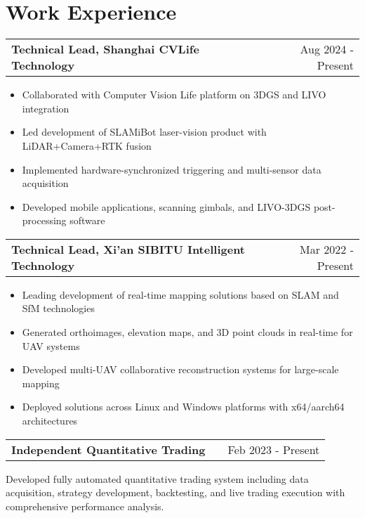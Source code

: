 \documentclass[a4paper,12pt]{article}
\makeatletter
\newenvironment{jobshort}[2]
    {
    \begin{tabularx}{\linewidth}{@{}l X r@{}}
    \textbf{#1} & \hfill &  #2 \\[3.75pt]
    \end{tabularx}
    }
    {
    }
\newenvironment{joblong}[2]
    {
    \begin{tabularx}{\linewidth}{@{}l X r@{}}
    \textbf{#1} & \hfill &  #2 \\[3.75pt]
    \end{tabularx}
    \begin{minipage}[t]{\linewidth}
    \begin{itemize}[nosep,after=\strut, leftmargin=1em, itemsep=3pt,label=--]
    }
    {
    \end{itemize}
    \end{minipage}    
    }
\makeatother
\begin{document}
\section{Work Experience}

\begin{joblong}{Technical Lead, Shanghai CVLife Technology}{Aug 2024 - Present}
\item Collaborated with Computer Vision Life platform on 3DGS and LIVO integration
\item Led development of SLAMiBot laser-vision product with LiDAR+Camera+RTK fusion
\item Implemented hardware-synchronized triggering and multi-sensor data acquisition
\item Developed mobile applications, scanning gimbals, and LIVO-3DGS post-processing software
\end{joblong}

\begin{joblong}{Technical Lead, Xi'an SIBITU Intelligent Technology}{Mar 2022 - Present}
\item Leading development of real-time mapping solutions based on SLAM and SfM technologies
\item Generated orthoimages, elevation maps, and 3D point clouds in real-time for UAV systems
\item Developed multi-UAV collaborative reconstruction systems for large-scale mapping
\item Deployed solutions across Linux and Windows platforms with x64/aarch64 architectures
\end{joblong}

\begin{jobshort}{Independent Quantitative Trading}{Feb 2023 - Present}
Developed fully automated quantitative trading system including data acquisition, strategy development, backtesting, and live trading execution with comprehensive performance analysis.
\end{jobshort}

\end{document}
